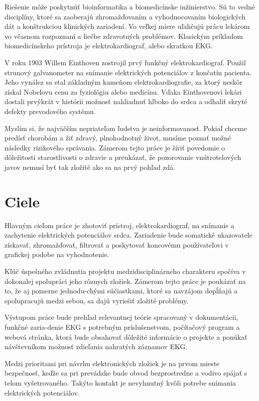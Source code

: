 \documentclass[titlepage,12pt]{article}
\begin{document}
Riešenie môže poskytnúť bioinformatika a biomedicínske inžinierstvo. Sú to vedné disciplíny, ktoré sa zaoberajú zhromažďovaním a vyhodnocovaním biologických dát a konštrukciou klinických zariadení. Vo veľkej miere uľahčujú prácu lekárom vo včasnom rozpoznaní a liečbe zdravotných problémov. Klasickým príkladom biomedicínskeho prístroja je elektrokardiograf, alebo skratkou EKG. 

V roku 1903 Willem Einthoven zostrojil prvý funkčný elektrokardiograf. Použil strunový galvanometer na snímanie elektrických potenciálov z končatín pacienta. Jeho vynález sa stal základným kameňom elektrokardiografie, za ktorý neskôr získal Nobelovu cenu za fyziológiu alebo medicínu. Vďaka Einthovenovi lekári dostali prvýkrát v histórii možnosť nahliadnuť hlboko do srdca a odhaliť skryté defekty prevodového systému.

Myslím si, že najväčším nepriateľom ľudstva je neinformovanosť. Pokiaľ chceme predísť chorobám a žiť zdravý, plnohodnotný život, musíme poznať možné následky rizikového správania. Zámerom tejto práce je šíriť povedomie o dôležitosti starostlivosti o zdravie a preukázať, že pozorovanie vnútrotelových javov nemusí byť tak zložité ako sa na prvý pohľad zdá. 



\newpage
\section{Ciele}
Hlavným cieľom práce je zhotoviť prístroj, elektrokardiograf, na snímanie a zachytenie elektrických potenciálov srdca. Zariadenie bude somatické ukazovatele získavať, zhromažďovať, filtrovať a poskytovať koncovému používateľovi v grafickej podobe na vyhodnotenie.

Kľúč úspešného zvládnutia projektu medzidisciplinárneho charakteru spočíva v dokonalej spolupráci jeho rôznych zložiek. Zámerom tejto práce je poukázať na to, že aj pomerne jednodu-chými súčiastkami, ktoré sa navzájom dopĺňajú a spolupracujú medzi sebou, sa dajú vyriešiť zložité problémy.

Výstupom práce bude prehľad relevantnej teórie spracovaný v dokumentácii, 
funkčné zaria-denie EKG s potrebným príslušenstvom, počítačový program a webová stránka, ktorá bude obsahovať dôležité informácie o projekte a ponúkať návštevníkom možnosť zdieľania nahratých záznamov EKG.

Medzi prioritami pri návrhu elektronických zložiek je na prvom mieste bezpečnosť, keďže sa pri prevádzke bude obvod bezprostredne a vodivo spájať s telom vyšetrovaného. Takýto kontakt je nevyhnutný kvôli potrebe snímania elektrických potenciálov.
\end{document}
